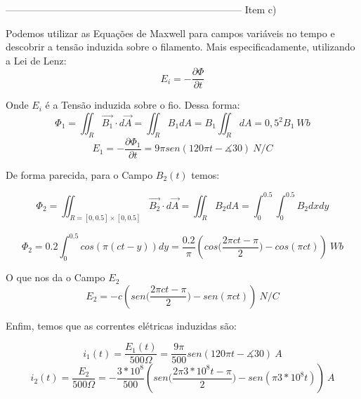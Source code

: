 \documentclass[journal,comsoc]{IEEEtran}
\begin{document}
------------------------------------------------------------------------
Item c)

\par Podemos utilizar as Equações de Maxwell para campos variáveis no tempo e descobrir a tensão induzida sobre o filamento. Mais especificadamente, utilizando a Lei de Lenz:
\begin{equation}
	E_{i} = -\frac{\partial{\Phi}}{\partial{t}}
\end{equation}
\par Onde $E_{i}$ é a Tensão induzida sobre o fio. Dessa forma:
\begin{equation}
	\Phi_{1} = \iint_{R} \vec{B_{1}}\cdot d\vec{A} = \iint_{R}B_{1}dA = B_{1}\iint_{R}dA = 0,5^2B_{1}\ Wb
\end{equation}
\begin{equation}
	E_{1} = -\frac{\partial{\Phi_{1}}}{\partial{t}} = 9\pi sen(120\pi t-\measuredangle30)\ N/C
\end{equation}

\par De forma parecida, para o Campo $B_{2}(t)$ temos:

\begin{equation}
	\Phi_{2} = \iint_{R=[0,0.5]\times[0,0.5]} \vec{B_{2}}\cdot d\vec{A} = \iint_{R}B_{2}dA = \int_0^{0.5} \int_0^{0.5} B_{2} dxdy
\end{equation}

\begin{equation}
	\Phi_{2} = 0.2 \int_0^{0.5} cos(\pi(ct-y)) dy = \frac{0.2}{\pi} (cos\Big(\frac{2\pi ct-\pi}{2}\Big) - cos(\pi ct))\ Wb
\end{equation}

\par O que nos da o Campo $E_{2}$
\begin{equation}
	E_{2} = -c(sen\Big(\frac{2\pi ct-\pi}{2}\Big)-sen(\pi ct))\ N/C
\end{equation}

\par Enfim, temos que as correntes elétricas induzidas são:

\begin{equation}
	i_{1}(t) = \frac{E_{1}(t)}{500\Omega} = \frac{9\pi}{500}sen(120\pi t-\measuredangle30)\ A
\end{equation}
\begin{equation}
i_{2}(t) = \frac{E_{2}}{500\Omega} = -\frac{3*10^8}{500}(sen\Big(\frac{2\pi 3*10^8t-\pi}{2}\Big)-sen(\pi 3*10^8t))\ A
\end{equation}
\end{document}
